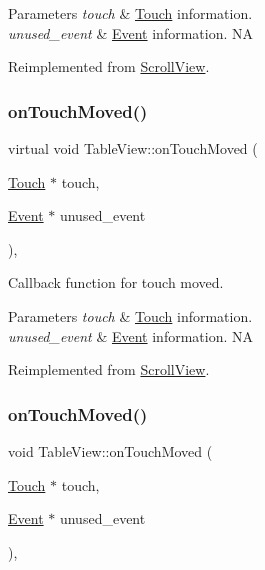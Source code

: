 \begin{DoxyParams}{Parameters}
{\em touch} & \hyperlink{classTouch}{Touch} information. \\
\hline
{\em unused\+\_\+event} & \hyperlink{classEvent}{Event} information.  NA \\
\hline
\end{DoxyParams}


Reimplemented from \hyperlink{classScrollView_a86f57715da926a475b75d67eff84701d}{Scroll\+View}.

\mbox{\label{classTableView_a242e9d8c695681b41eef636471e768b5}} 
\subsubsection{\texorpdfstring{on\+Touch\+Moved()}{onTouchMoved()}\hspace{0.1cm}{\footnotesize\ttfamily [1/2]}}
{\footnotesize\ttfamily virtual void Table\+View\+::on\+Touch\+Moved (\begin{DoxyParamCaption}\item[{\hyperlink{classTouch}{Touch} $\ast$}]{touch,  }\item[{\hyperlink{classEvent}{Event} $\ast$}]{unused\+\_\+event }\end{DoxyParamCaption})\hspace{0.3cm}{\ttfamily [override]}, {\ttfamily [virtual]}}

Callback function for touch moved.


\begin{DoxyParams}{Parameters}
{\em touch} & \hyperlink{classTouch}{Touch} information. \\
\hline
{\em unused\+\_\+event} & \hyperlink{classEvent}{Event} information.  NA \\
\hline
\end{DoxyParams}


Reimplemented from \hyperlink{classScrollView_a0958fd1a06430212b3d3cbe26ce2bb9c}{Scroll\+View}.

\mbox{\label{classTableView_acd131e5fa29332743e625a1a0d047965}} 
\subsubsection{\texorpdfstring{on\+Touch\+Moved()}{onTouchMoved()}\hspace{0.1cm}{\footnotesize\ttfamily [2/2]}}
{\footnotesize\ttfamily void Table\+View\+::on\+Touch\+Moved (\begin{DoxyParamCaption}\item[{\hyperlink{classTouch}{Touch} $\ast$}]{touch,  }\item[{\hyperlink{classEvent}{Event} $\ast$}]{unused\+\_\+event }\end{DoxyParamCaption})\hspace{0.3cm}{\ttfamily [override]}, {\ttfamily [virtual]}}

